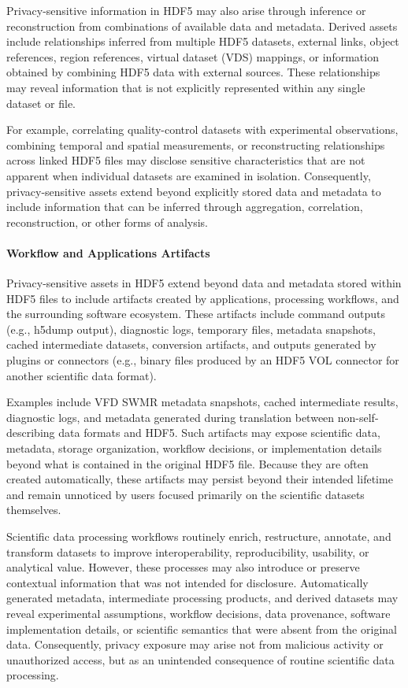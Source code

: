 \documentclass[../main.tex]{subfiles}
\begin{document}
Privacy-sensitive information in HDF5 may also arise through inference or reconstruction 
from combinations of available data and metadata. Derived assets include relationships 
inferred from multiple HDF5 datasets, external links, object references, 
region references, virtual dataset (VDS) mappings, or information obtained by 
combining HDF5 data with external sources. 
These relationships may reveal information that is not explicitly represented within any single dataset or file.

For example, correlating quality-control datasets with experimental observations, combining 
temporal and spatial measurements, or reconstructing relationships across linked HDF5 files 
may disclose sensitive characteristics that are not apparent when individual datasets 
are examined in isolation. Consequently, privacy-sensitive assets extend beyond explicitly 
stored data and metadata to include information that can be inferred through aggregation, 
correlation, reconstruction, or other forms of analysis.

\paragraph{Workflow and Applications Artifacts}

Privacy-sensitive assets in HDF5 extend beyond data and metadata stored within HDF5 files 
to include artifacts created by applications, processing workflows, and the surrounding 
software ecosystem. These artifacts include command outputs (e.g., h5dump output), 
diagnostic logs, temporary files, metadata snapshots, cached intermediate datasets, 
conversion artifacts, and outputs generated by plugins or connectors 
(e.g., binary files produced by an HDF5 VOL connector for another scientific data format).

Examples include VFD SWMR metadata snapshots, cached intermediate results, diagnostic logs, 
and metadata generated during translation between non-self-describing data formats and HDF5. 
Such artifacts may expose scientific data, metadata, storage organization, workflow decisions, 
or implementation details beyond what is contained in the original HDF5 file. 
Because they are often created automatically, these artifacts may persist beyond their 
intended lifetime and remain unnoticed by users focused primarily on the scientific datasets themselves.

Scientific data processing workflows routinely enrich, restructure, annotate, and transform 
datasets to improve interoperability, reproducibility, usability, or analytical value. 
However, these processes may also introduce or preserve contextual information that was not intended for disclosure. 
Automatically generated metadata, intermediate processing products, and derived datasets may 
reveal experimental assumptions, workflow decisions, data provenance, software 
implementation details, or scientific semantics that were absent from the original data. 
Consequently, privacy exposure may arise not from malicious activity or unauthorized access, 
but as an unintended consequence of routine scientific data processing.
\end{document}
